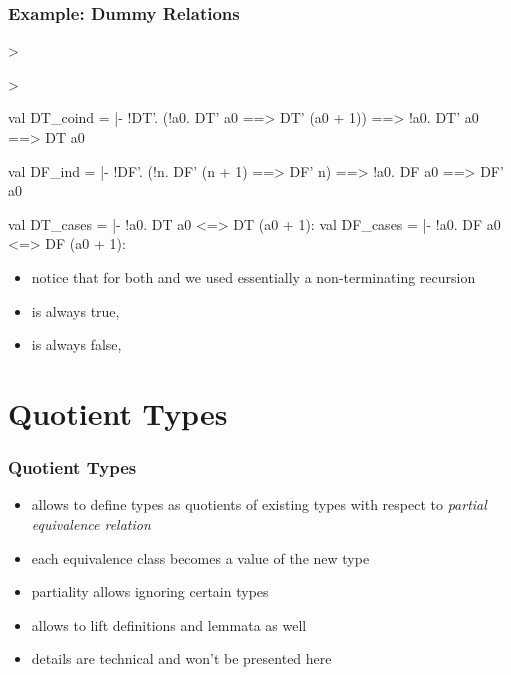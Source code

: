 \begin{frame}[fragile]
\frametitle{Example: Dummy Relations}
\begin{semiverbatim}\scriptsize
> 

> 

val DT_coind =
  |- !DT'. (!a0. DT' a0 ==> DT' (a0 + 1)) ==> !a0. DT' a0 ==> DT a0

val DF_ind =
  |- !DF'. (!n. DF' (n + 1) ==> DF' n) ==> !a0. DF a0 ==> DF' a0

val DT_cases = |- !a0. DT a0 <=> DT (a0 + 1):
val DF_cases = |- !a0. DF a0 <=> DF (a0 + 1):
\end{semiverbatim}
\begin{itemize}
\item notice that for both  and  we used essentially a non-terminating recursion
\item {} is always true, \ie {}
\item {} is always false, \ie {}
\end{itemize}
\end{frame}



\section{Quotient Types}

\begin{frame}
\frametitle{Quotient Types}

\begin{itemize}
\item {} allows to define types as quotients of existing types with respect to \emph{partial equivalence relation}
\item each equivalence class becomes a value of the new type
\item partiality allows ignoring certain types
\item {} allows to lift definitions and lemmata as well
\item details are technical and won't be presented here
\end{itemize}

\end{frame}



